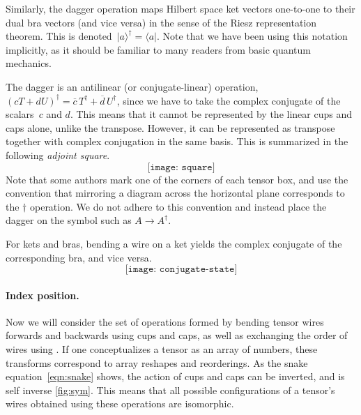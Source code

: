 \documentclass[aps,pra,12pt,nofootinbib,superscriptaddress,longbibliography]{revtex4-1}
\newcommand{\vb}[1]{}
\theoremstyle{plain}
\theoremstyle{definition}
\newcommand{\bra}[1]{\mbox{$\langle #1|$}}
\newcommand{\ket}[1]{\mbox{$|#1\rangle$}}
\newcommand{\swap}{{\sf{SWAP}}}
\newcommand{\be}{\begin{equation}}
\newcommand{\ee}{\end{equation}}
\begin{document}
Similarly, the dagger operation maps Hilbert space ket vectors one-to-one to their dual bra vectors (and vice versa)
in the sense of the Riesz representation theorem.
This is denoted~$\ket{a}^\dagger = \bra{a}$.
Note that we have been using this notation implicitly, %
as it should be familiar to many readers from basic quantum mechanics.

The dagger is an antilinear (or conjugate-linear) operation, $(cT+dU)^\dagger = \overline{c} \, T^\dagger+\overline{d} \, U^\dagger$,
since we have to take the complex conjugate of the scalars~$c$ and $d$.
This means that it cannot be represented by the linear cups and caps alone, unlike the transpose.
However, it can be represented as transpose together with complex conjugation in the same basis.
This is summarized in the following \emph{adjoint square}.
\be
 \texttt{[image: square]}
\ee
Note that some authors mark one of the corners of each tensor box, and use the convention that mirroring a diagram across the horizontal plane corresponds to the $\dagger$ operation.
We do not adhere to this convention and instead place the dagger on the symbol such as $A\rightarrow A^\dagger$.  

For kets and bras, bending a wire on a ket yields the complex conjugate of the corresponding bra, and vice versa.
\be
 \texttt{[image: conjugate-state]}
\ee




\paragraph{{\bf Index position.}}
Now we will consider the set of operations formed by bending tensor
wires forwards and backwards using cups and caps,
as well as exchanging the order of wires using \swap{}.
If one conceptualizes a tensor as an array of numbers,
these transforms correspond to array reshapes and reorderings.
As the snake equation~\eqref{eqn:snake} shows, the action of cups and caps can be
inverted, and \swap{} is self inverse \eqref{fig:sym}. This means that all possible configurations of a tensor's wires obtained using these operations are isomorphic.
\end{document}

